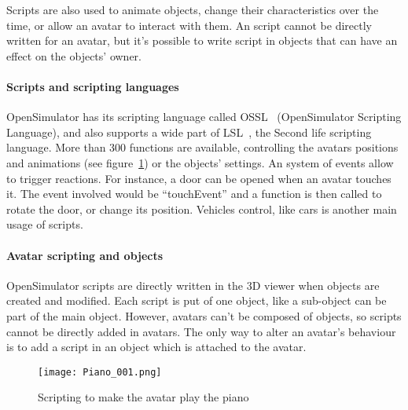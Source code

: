 Scripts are also used to animate objects, change their characteristics over the time, or allow an avatar to interact with them. An script cannot be directly written for an avatar, but it's possible to write script in objects that can have an effect on the objects' owner.


\paragraph{Scripts and scripting languages}
OpenSimulator has its scripting language called OSSL~\cite{OSSLWebsite} (OpenSimulator Scripting Language), and also supports a wide part of LSL~\cite{URLLSL}, the Second life scripting language. More than 300 functions are available, controlling the avatars positions and animations (see figure~\ref{fig:piano}) or the objects' settings. An system of events allow to trigger reactions. For instance, a door can be opened when an avatar touches it. The event involved would be ``touchEvent'' and a function is then called to rotate the door, or change its position. Vehicles control, like cars is another main usage of scripts.

\paragraph{Avatar scripting and objects}
OpenSimulator scripts are directly written in the 3D viewer when objects are created and modified. Each script is put of one object, like a sub-object can be part of the main object. However, avatars can't be composed of objects, so scripts cannot be directly added in avatars. The only way to alter an avatar's behaviour is to add a script in an object which is attached to the avatar.  

\begin{figure}[h]
  \caption{Scripting to make the avatar play the piano}
  \centering
  \texttt{[image: Piano\_001.png]}
  \label{fig:piano}
\end{figure}


